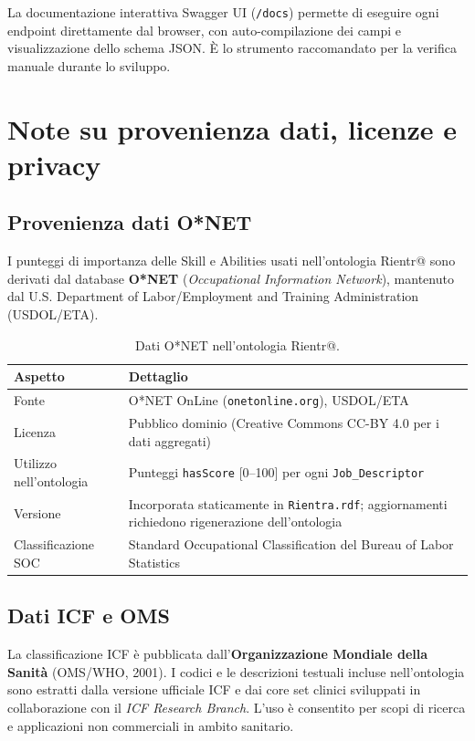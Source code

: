 \documentclass[a4paper,12pt]{article}
\begin{document}
\noindent La documentazione interattiva Swagger UI (\texttt{/docs}) permette di
eseguire ogni endpoint direttamente dal browser, con auto-compilazione
dei campi e visualizzazione dello schema JSON. \`{E} lo strumento
raccomandato per la verifica manuale durante lo sviluppo.

\section{Note su provenienza dati, licenze e privacy}

\subsection{Provenienza dati O*NET}

I punteggi di importanza delle Skill e Abilities usati nell'ontologia
Rientr@ sono derivati dal database \textbf{O*NET} (\textit{Occupational
Information Network}), mantenuto dal U.S. Department of Labor/Employment
and Training Administration (USDOL/ETA).

\begin{table}[H]
\centering
\caption{Dati O*NET nell'ontologia Rientr@.}
\begin{tabular}{L{4cm} L{8.5cm}}
\toprule
\textbf{Aspetto} & \textbf{Dettaglio} \\
\midrule
Fonte & O*NET OnLine (\texttt{onetonline.org}), USDOL/ETA \\
Licenza & Pubblico dominio (Creative Commons CC-BY 4.0 per i dati aggregati) \\
Utilizzo nell'ontologia & Punteggi \texttt{hasScore} [0--100] per ogni \texttt{Job\_Descriptor} \\
Versione & Incorporata staticamente in \texttt{Rientra.rdf}; aggiornamenti richiedono rigenerazione dell'ontologia \\
Classificazione SOC & Standard Occupational Classification del Bureau of Labor Statistics \\
\bottomrule
\end{tabular}
\end{table}

\subsection{Dati ICF e OMS}

La classificazione ICF \`{e} pubblicata dall'\textbf{Organizzazione
Mondiale della Sanit\`{a}} (OMS/WHO, 2001). I codici e le descrizioni
testuali incluse nell'ontologia sono estratti dalla versione ufficiale
ICF e dai core set clinici sviluppati in collaborazione con il
\textit{ICF Research Branch}. L'uso \`{e} consentito per scopi di
ricerca e applicazioni non commerciali in ambito sanitario.
\end{document}
